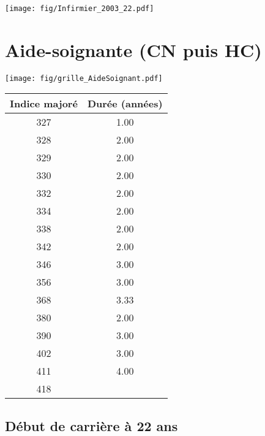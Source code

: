 \vspace{0.1cm} 

 \begin{center}\texttt{[image: fig/Infirmier\_2003\_22.pdf]}\end{center} \label{fig/Infirmier_2003_22.pdf} 

\newpage 
 
\chapter{Aide-soignante (CN puis HC)} 

\begin{minipage}{0.55\linewidth}\texttt{[image: fig/grille\_AideSoignant.pdf]}\end{minipage} 
\begin{minipage}{0.3\linewidth} 
 \begin{center} 

\begin{tabular}[htb]{|c|c|} 
\hline 
 Indice majoré &  Durée (années) \\ 
\hline \hline 
 327 &  1.00 \\ 
\hline 
 328 &  2.00 \\ 
\hline 
 329 &  2.00 \\ 
\hline 
 330 &  2.00 \\ 
\hline 
 332 &  2.00 \\ 
\hline 
 334 &  2.00 \\ 
\hline 
 338 &  2.00 \\ 
\hline 
 342 &  2.00 \\ 
\hline 
 346 &  3.00 \\ 
\hline 
 356 &  3.00 \\ 
\hline 
 368 &  3.33 \\ 
\hline 
 380 &  2.00 \\ 
\hline 
 390 &  3.00 \\ 
\hline 
 402 &  3.00 \\ 
\hline 
 411 &  4.00 \\ 
\hline 
 418 &   \\ 
\hline 
\hline 
\end{tabular} 
\end{center} 
 \end{minipage} 


 \addto{\captionsenglish}{ \renewcommand{\mtctitle}{}} \setcounter{minitocdepth}{2} 
 \minitoc \newpage 

\section{Début de carrière à 22 ans} 

